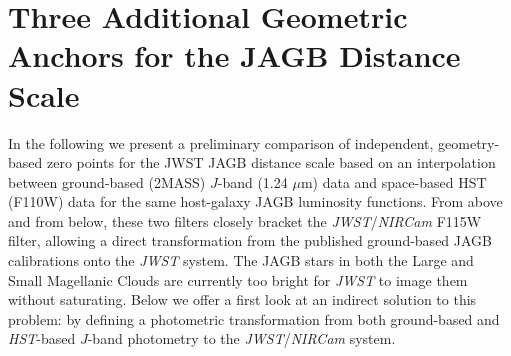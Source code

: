 \documentclass[12pt,modern]{aastex631}
\newcommand{\hst}{\emph{HST}\xspace}
\newcommand{\jwst}{\emph{JWST}\xspace}
\newcommand{\nircam}{\emph{NIRCam}\xspace}
\begin{document}
%

\vspace{5mm}


          


\clearpage
{}

\appendix
\section{Three Additional Geometric Anchors for the JAGB Distance Scale} 
\label{App:AppendixA}



In the following we present a preliminary comparison of independent, geometry-based zero points for the JWST JAGB distance scale based on an interpolation between ground-based (2MASS) $J$-band (1.24 $\mu$m) data and space-based HST (F110W) data
for the same host-galaxy JAGB luminosity functions. 
From above and from below, these two filters closely bracket the \jwst/\nircam F115W filter, allowing a direct transformation from  the published ground-based JAGB calibrations onto the \jwst system.
The JAGB stars in both the Large and Small Magellanic Clouds are currently too bright for \jwst to image them without saturating. Below we offer a first look at an indirect solution to this problem: by defining a photometric transformation from both ground-based and \hst-based $J$-band photometry to the \jwst/\nircam system.
\end{document}
